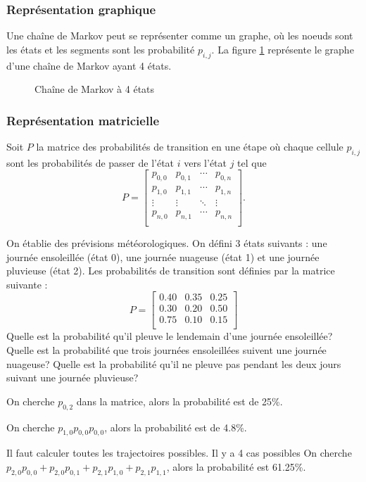 \documentclass[11pt]{article}
\begin{document}
\subsubsection{Représentation graphique}
Une chaîne de Markov peut se représenter comme un graphe, où les noeuds sont
les états et les segments sont les probabilité $p_{i,j}$. La figure
\ref{fig:markov_graph} représente le graphe d'une chaîne de Markov ayant 4
états.

\begin{figure}[H]
	\centering
	
	\caption{Chaîne de Markov à 4 états}
	\label{fig:markov_graph}
\end{figure}

\subsubsection{Représentation matricielle}
Soit $P$ la matrice des probabilités de transition en une étape où chaque
cellule $p_{i,j}$ sont les probabilités de passer de l'état $i$ vers l'état $j$
tel que
\begin{equation*}
	P=\left[
		\begin{matrix}
			p_{0,0} & p_{0,1} & \cdots & p_{0,n}\\
			p_{1,0} & p_{1,1} & \cdots & p_{1,n}\\
			\vdots  & \vdots  & \ddots & \vdots \\
			p_{n,0} & p_{n,1} & \cdots & p_{n,n}\\
		\end{matrix}
	\right].
\end{equation*}

\begin{exemple}
	On établie des prévisions météorologiques. On défini 3 états suivants : une
	journée ensoleillée (état 0), une journée nuageuse (état 1) et une journée
	pluvieuse (état 2). Les probabilités de transition sont définies par la
	matrice suivante :
	\begin{equation*}
		P=\left[
			\begin{matrix}
				0.40 & 0.35 & 0.25\\
				0.30 & 0.20 & 0.50\\
				0.75 & 0.10 & 0.15\\
			\end{matrix}
		\right]
	\end{equation*}
	Quelle est la probabilité qu'il pleuve le lendemain d'une journée
	ensoleillée? Quelle est la probabilité que trois journées ensoleillées
	suivent une journée nuageuse? Quelle est la probabilité qu'il ne pleuve pas
	pendant les deux jours suivant une journée pluvieuse?

	On cherche $p_{0,2}$ dans la matrice, alors la probabilité est de 25\%.

	On cherche $p_{1,0}p_{0,0}p_{0,0}$, alors la probabilité est de 4.8\%.

	Il faut calculer toutes les trajectoires possibles. Il y a 4 cas possibles
	On cherche $p_{2,0}p_{0,0}+p_{2,0}p_{0,1}+p_{2,1}p_{1,0}+p_{2,1}p_{1,1}$,
	alors la probabilité est 61.25\%.
\end{exemple}
\end{document}
